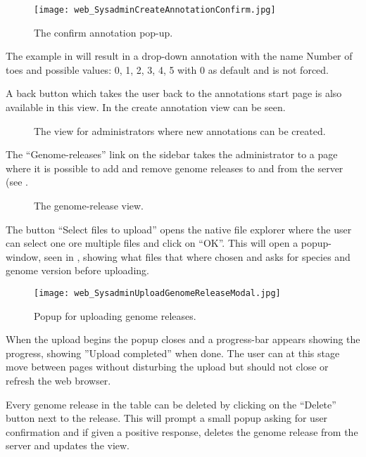 \begin{figure}[h]
 \centering
 \texttt{[image: web\_SysadminCreateAnnotationConfirm.jpg]}
 \caption{The confirm annotation pop-up.}
 \label{adm_web_createPopup}
\end{figure}



The example in  will result in a drop-down annotation with the name Number of toes and possible values: 0, 1, 2, 3, 4, 5 with 0 as default and is not forced.

A back button which takes the user back to the annotations start page is also available in this view. In  the create annotation view can be seen.

\begin{figure}[t]
 \caption{The view for administrators where new annotations can be created.}
 \label{adm_web_createView}
\end{figure}

The “Genome-releases” link on the sidebar takes the administrator to a page where it is possible to add and remove genome releases to and from the server (see .

\begin{figure}[h]
 \caption{The genome-release view.}
 \label{adm_web_genomereleaseView}
\end{figure}

The button “Select files to upload” opens the native file explorer where the user can select one ore multiple files and click on “OK”. This will open a popup-window, seen in , showing what files that where chosen and asks for species and genome version before uploading. 

\begin{figure}[h]
 \centering
 \texttt{[image: web\_SysadminUploadGenomeReleaseModal.jpg]}
 \caption{Popup for uploading genome releases.}
 \label{adm_web_uploadconfirm}
\end{figure}

When the upload begins the popup closes and a progress-bar appears showing the progress, showing ''Upload completed'' when done. The user can at this stage move between pages without disturbing the upload but should not close or refresh the web browser. 

Every genome release in the table can be deleted by clicking on the “Delete” button next to the release. This will prompt a small popup asking for user confirmation and if given a positive response, deletes the genome release from the server and updates the view. 

